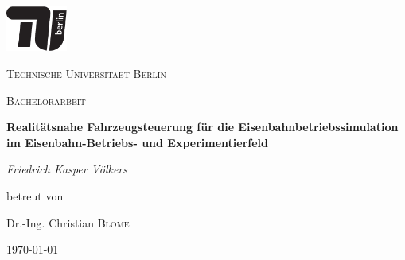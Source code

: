 \newpage
\centering
\includegraphics[width=0.15\textwidth]{TU_Logo/TU_Logo_kurz_1c_schwarz.pdf}\par\vspace{1cm}
{\scshape\LARGE Technische Universitaet Berlin\par}
\vspace{1cm}
{\scshape\Large Bachelorarbeit\par}
\vspace{1.5cm}
{\huge\bfseries Realitätsnahe Fahrzeugsteuerung für die Eisenbahnbetriebssimulation im Eisenbahn-Betriebs- und Experimentierfeld\par}
\vspace{2cm}
{\Large\itshape Friedrich Kasper Völkers\par}
\vfill
betreut von\par
Dr.-Ing. Christian \textsc{Blome}

\vfill
{\large \today\par}
\justifying
\newpage